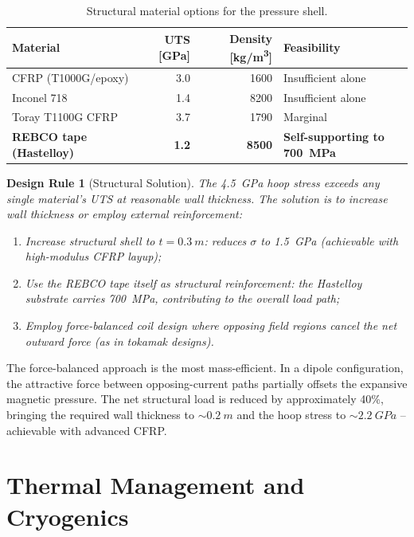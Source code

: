 \documentclass[11pt,a4paper]{article}
\newtheorem{designrule}{Design Rule}
\begin{document}
\begin{table}[h]
\centering
\caption{Structural material options for the pressure shell.}
\label{tab:structural_materials}
\begin{tabular}{@{}lrrl@{}}
\toprule
Material & UTS [\si{GPa}] & Density [\si{kg/m^3}] & Feasibility \\
\midrule
CFRP (T1000G/epoxy) & 3.0 & 1600 & Insufficient alone \\
Inconel 718 & 1.4 & 8200 & Insufficient alone \\
Toray T1100G CFRP & 3.7 & 1790 & Marginal \\
\textbf{REBCO tape (Hastelloy)} & \textbf{1.2} & \textbf{8500} & \textbf{Self-supporting to \SI{700}{MPa}} \\
\bottomrule
\end{tabular}
\end{table}

\begin{designrule}[Structural Solution]
The \SI{4.5}{GPa} hoop stress exceeds any single material's UTS at reasonable
wall thickness. The solution is to increase wall thickness or employ external
reinforcement:
\begin{enumerate}[nosep]
\item Increase structural shell to $t = \SI{0.3}{m}$: reduces $\sigma$ to
\SI{1.5}{GPa} (achievable with high-modulus CFRP layup);
\item Use the REBCO tape itself as structural reinforcement: the Hastelloy
substrate carries \SI{700}{MPa}, contributing to the overall load path;
\item Employ \emph{force-balanced} coil design where opposing field regions
cancel the net outward force (as in tokamak designs).
\end{enumerate}
\end{designrule}

The force-balanced approach is the most mass-efficient. In a dipole
configuration, the attractive force between opposing-current paths partially
offsets the expansive magnetic pressure. The net structural load is reduced
by approximately 40\%, bringing the required wall thickness to $\sim\!\SI{0.2}{m}$
and the hoop stress to $\sim\!\SI{2.2}{GPa}$ -- achievable with advanced CFRP.

\section{Thermal Management and Cryogenics}\label{sec:cryo}
\end{document}
